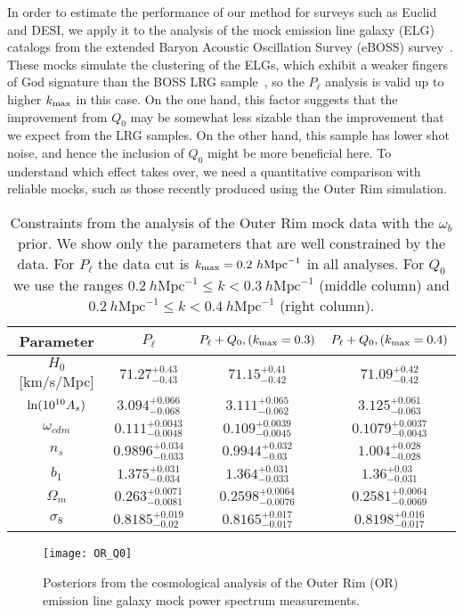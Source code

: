 \documentclass[12pt,a4paper]{article}
\newcommand\hMpc{h\text{Mpc}^{-1}}
\renewcommand{\ln}{\mathop{\rm ln}\nolimits}
\begin{document}
In order to estimate the performance of our method for surveys such as Euclid and DESI, we apply it to the analysis of the mock emission line 
galaxy (ELG) catalogs from the extended Baryon Acoustic Oscillation 
Survey (eBOSS) survey~\cite{Alam:2020jvh}. These mocks simulate the clustering of the ELGs, which exhibit a weaker fingers of God signature than the BOSS LRG sample~\cite{Ivanov:2021zmi}, so the $P_\ell$ analysis is valid up to higher 
$k_{\rm max}$ in this case.
On the one hand, this factor suggests that the improvement 
from $Q_0$ may be somewhat less sizable than the improvement that we 
expect from the LRG samples. 
On the other hand, this sample has lower shot noise,
and hence the inclusion of $Q_0$ might be more beneficial here.
To understand which effect takes over, we need a quantitative 
comparison with reliable mocks, such as those recently produced using the Outer Rim simulation.



\begin{table*}[ht!]
\begin{center}
  \begin{tabular}{|c||c|c|c|} \hline
   Parameter   &  $P_{\ell}$ 
   &  $P_\ell+Q_0, (k_{\rm max}=0.3)$  
    & $P_\ell+Q_0,(k_{\rm max}=0.4)$
     \\ [0.2cm]
      \hline 
$H_0$ [km/s/Mpc]   & $71.27_{-0.43}^{+0.43}$
& $71.15_{-0.42}^{+0.41}$
& $71.09_{-0.42}^{+0.42}$\\ \hline
$\ln(10^{10}A_s)$   & $3.094_{-0.068}^{+0.066}$
& $3.111_{-0.062}^{+0.065}$
& $3.125_{-0.063}^{+0.061}$
\\ 
\hline
     $\omega_{cdm}$  &
$0.111_{-0.0048}^{+0.0043}$
  & $0.109_{-0.0045}^{+0.0039}$ 
  & $0.1079_{-0.0043}^{+0.0037}$
   \\  \hline
     $n_s$  &
$0.9896_{-0.033}^{+0.034}$
  & $0.9944_{-0.03}^{+0.032}$
  & $1.004_{-0.028}^{+0.028}$
   \\  \hline
   $b_1 $   & $1.375_{-0.034}^{+0.031}  $
& $1.364_{-0.033}^{+0.031}$ 
& $1.36_{-0.031}^{+0.03}$ 
\\ 
   \hline \hline 
$\Omega_m$   & $0.263_{-0.0081}^{+0.0071}$
& $0.2598_{-0.0076}^{+0.0064}$
& $0.2581_{-0.0069}^{+0.0064}$\\ \hline
$\sigma_8$   
& $0.8185_{-0.02}^{+0.019}$
& $0.8165_{-0.017}^{+0.017}$
&$0.8198_{-0.017}^{+0.016}$ \\ 
\hline
\end{tabular}
\caption{Constraints from the analysis of the Outer Rim mock data with the $\omega_b$ prior. 
We show only the parameters that are 
well constrained by the data. 
For $P_\ell$ the data cut is $k_{\rm max}=0.2~\hMpc$ 
in all analyses. 
For $Q_0$ we use the ranges $ 0.2~\hMpc\leq k<0.3~\hMpc$ (middle column) and $ 0.2~\hMpc\leq k<0.4~\hMpc$ (right column).
}
\label{tab:elg}
\end{center}
\end{table*}
\begin{figure}[ht!]
\centering
 \texttt{[image: OR\_Q0]}
    \caption{
Posteriors from the cosmological analysis of the 
    Outer Rim (OR) emission line galaxy mock power spectrum measurements.
    }
    \label{fig:or}
\end{figure}
\end{document}
